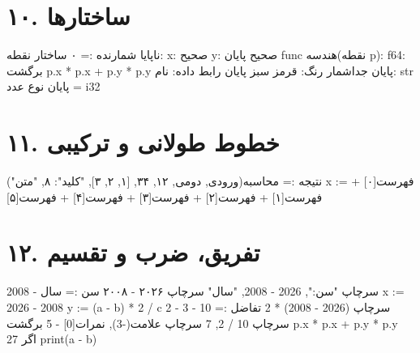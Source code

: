 \documentclass[11pt,openany]{book}
\begin{document}
\section*{۱۰. ساختارها}
\begin{salamfa}
    ناپایا شمارنده := ۰
    ساختار نقطه:
        x: صحیح
        y: صحیح
    پایان
    func هندسه(نقطه p): f64:
        برگشت p.x * p.x + p.y * p.y
    پایان
    جداشمار رنگ:
        قرمز
        سبز
    پایان
    رابط داده:
        نام: str
    پایان
    نوع عدد = i32
\end{salamfa}

\section*{۱۱. خطوط طولانی و ترکیبی}
\begin{salamfa}
    نتیجه := محاسبه(ورودی, دومی, ۱۲, ۳۴, [۱, ۲, ۳], {"کلید": ۸}, "متن")
    x := فهرست[۰] + فهرست[۱] + فهرست[۲] + فهرست[۳] + فهرست[۴] + فهرست[۵]
\end{salamfa}


\section*{۱۲. تفریق، ضرب و تقسیم}
\begin{salamfa}
    سرچاپ "سن:", 2026 - 2008, "سال"
    سرچاپ ۲۰۲۶ - ۲۰۰۸
    سن := سال - 2008
    x := 2026 - 2008
    y := (a - b) * 2 / c
    سرچاپ (2026 - 2008) * 2
    تفاضل := 10 - 3 - 2
    سرچاپ 10 / 2, 7 %
    سرچاپ علامت(-3), نمرات[0] - 5
    برگشت p.x * p.x + p.y * p.y
    اگر 27 %
    print(a - b)
\end{salamfa}
\end{document}
